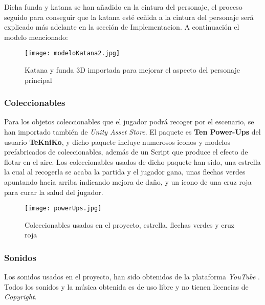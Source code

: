 Dicha funda y katana se han añadido en la cintura del personaje, el proceso seguido para conseguir que la katana esté ceñida a la cintura del personaje será explicado más adelante en la sección de Implementacion. A continuación el modelo mencionado:

\begin{figure}[H]
    \centering
    \texttt{[image: modeloKatana2.jpg]}
    \caption{Katana y funda 3D importada para mejorar el aspecto del personaje principal}
\end{figure}

\subsubsection{Coleccionables}

Para los objetos coleccionables que el jugador podrá recoger por el escenario, se han importado también de \textit{Unity Asset Store}. El paquete es \textbf{Ten Power-Ups} del usuario \textbf{TeKniKo}, y dicho paquete incluye numerosos iconos y modelos prefabricados de coleccionables, además de un Script que produce el efecto de flotar en el aire. Los coleccionables usados de dicho paquete han sido, una estrella la cual al recogerla se acaba la partida y el jugador gana, unas flechas verdes apuntando hacia arriba indicando mejora de daño, y un icono de una cruz roja para curar la salud del jugador.

\begin{figure}[H]
    \centering
    \texttt{[image: powerUps.jpg]}
    \caption{Coleccionables usados en el proyecto, estrella, flechas verdes y cruz roja}
\end{figure}


\subsubsection{Sonidos}

Los sonidos usados en el proyecto, han sido obtenidos de la plataforma \textit{YouTube} \cite{YouTube}. Todos los sonidos y la música obtenida es de uso libre y no tienen licencias de \textit{Copyright}.\\

